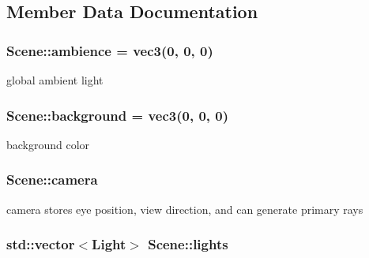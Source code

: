 \subsection{Member Data Documentation}
\subsubsection[{\texorpdfstring{ambience}{ambience}}]{ Scene\+::ambience = {\bf vec3}(0, 0, 0)\hspace{0.3cm}{\ttfamily [private]}}\hypertarget{classScene_a8809b5fcac40d60ab499e90f8ae592b3}{}\label{classScene_a8809b5fcac40d60ab499e90f8ae592b3}


global ambient light 

\subsubsection[{\texorpdfstring{background}{background}}]{ Scene\+::background = {\bf vec3}(0, 0, 0)\hspace{0.3cm}{\ttfamily [private]}}\hypertarget{classScene_ab2f20cf753edf2f92fec9b1ad7c9b93e}{}\label{classScene_ab2f20cf753edf2f92fec9b1ad7c9b93e}


background color 

\subsubsection[{\texorpdfstring{camera}{camera}}]{ Scene\+::camera\hspace{0.3cm}{\ttfamily [private]}}\hypertarget{classScene_afed13ec4ba2d7ab75b273d507911b498}{}\label{classScene_afed13ec4ba2d7ab75b273d507911b498}


camera stores eye position, view direction, and can generate primary rays 

\subsubsection[{\texorpdfstring{lights}{lights}}]{\setlength{\rightskip}{0pt plus 5cm}std\+::vector$<${\bf Light}$>$ Scene\+::lights\hspace{0.3cm}{\ttfamily [private]}}\hypertarget{classScene_ab3625e4ac3c6e47156edd23e2421e828}{}\label{classScene_ab3625e4ac3c6e47156edd23e2421e828}



